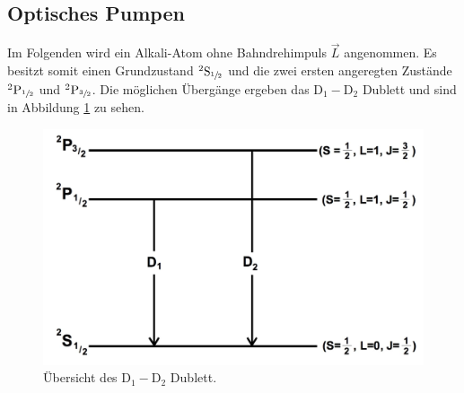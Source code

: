 \subsection{Optisches Pumpen}
Im Folgenden wird ein Alkali-Atom ohne Bahndrehimpuls $\vec{L}$ angenommen. Es besitzt somit einen Grundzustand ${}^2\text{S}_{\sfrac{1}{2}}$ und die zwei ersten angeregten Zustände ${}^2\text{P}_{\sfrac{1}{2}}$ und ${}^2\text{P}_{\sfrac{3}{2}}$. Die möglichen Übergänge ergeben das $\text{D}_1-\text{D}_2$ Dublett und sind in Abbildung \ref{fig:dublett} zu sehen.
\begin{figure}[H]
	\centering
	\includegraphics[width=0.7\linewidth]{img/dublett.jpg}
	\caption{Übersicht des $\text{D}_1-\text{D}_2$ Dublett.\cite{V21}}
	\label{fig:dublett}
\end{figure}

